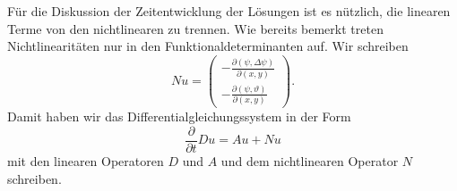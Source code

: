 Für die Diskussion der Zeitentwicklung der Lösungen ist es nützlich,
die linearen Terme von den nichtlinearen zu trennen.
Wie bereits bemerkt treten Nichtlinearitäten nur in den
Funktionaldeterminanten auf.
Wir schreiben
\[
Nu
=
\begin{pmatrix}
-\frac{\partial(\psi,\Delta\psi)}{\partial(x,y)}\\
-\frac{\partial(\psi,\vartheta)}{\partial(x,y)}
\end{pmatrix}.
\]
Damit haben wir das Differentialgleichungssystem in der Form
\begin{equation}
\frac{\partial}{\partial t}Du
=
Au+Nu
\end{equation}
mit den linearen Operatoren $D$ und $A$ und dem nichtlinearen Operator
$N$ schreiben.



